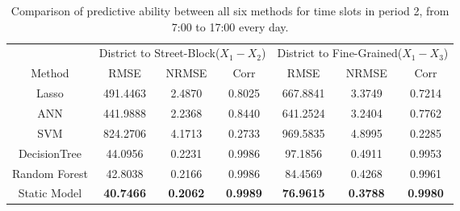 \documentclass[letterpaper]{article} %
\begin{document}
\begin{table*}[htb]
\small
\begin{center}
\begin{tabular}{ccccccc}
\toprule
 & \multicolumn{3}{c}{District to Street-Block($X_1-X_2$)} & 
\multicolumn{3}{c}{District to Fine-Grained($X_1-X_3$)}\\
Method&RMSE&NRMSE&Corr&RMSE&NRMSE&Corr\\
\midrule
Lasso &491.4463&2.4870&0.8025&667.8841&3.3749&0.7214\\
ANN &441.9888&2.2368&0.8440&641.2524&3.2404&0.7762\\
SVM&824.2706 &4.1713 &0.2733&969.5835 &4.8995 &0.2285\\
DecisionTree&44.0956&0.2231&0.9986&97.1856&0.4911&0.9953\\
Random Forest&42.8038 &0.2166 &0.9986&84.4569 &0.4268 &0.9961\\
Static Model
&\textbf{40.7466}&\textbf{0.2062}&\textbf{0.9989}
&\textbf{76.9615}&\textbf{0.3788}&\textbf{0.9980}\\
\bottomrule
\end{tabular}
\caption{Comparison of predictive ability between all six methods for time slots in period 2, from 7:00 to 17:00 every day.}
\label{tab:period2 performance}
\end{center}
\end{table*}


\end{document}

